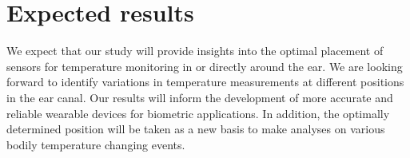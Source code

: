 \section{Expected results}
We expect that our study will provide insights into the optimal placement of sensors for temperature monitoring in or directly around the ear. We are looking forward to identify variations in temperature measurements at different positions in the ear canal. Our results will inform the development of more accurate and reliable wearable devices for biometric applications. In addition, the optimally determined position will be taken as a new basis to make analyses on various bodily temperature changing events.